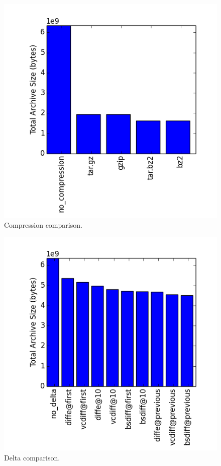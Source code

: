 \documentclass[11pt, twocolumn]{article}
\begin{document}
    \begin{figure}
      \centering
      \includegraphics[width=\linewidth]{images/tas_compression.png}
      \caption{Compression comparison.}
      \label{fig:tas_delta_compression:a}
    \end{figure}
    \begin{figure}
      \centering
      \includegraphics[width=\linewidth]{images/tas_delta.png}
      \caption{Delta comparison.}
      \label{fig:tas_delta_compression:b}
    \end{figure}
    
\end{document}
